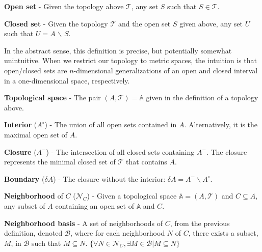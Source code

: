 \begin{defn}
  \textbf{Open set} - Given the topology above $\mathcal{T}$, any set $S$ such
  that $S \in \mathcal{T}$.
\end{defn}

\begin{defn}
  \textbf{Closed set} - Given the topology $\mathcal{T}$ and the open set $S$
  given above, any set $U$ such that $U = A$ $\backslash$ $S$.
\end{defn}

In the abstract sense, this definition is precise, but potentially somewhat unintuitive.
%
When we restrict our topology to metric spaces, the intuition is that open/closed sets are $n$-dimensional generalizations of an open and closed interval in a one-dimensional space, respectively.

\begin{defn}
  \textbf{Topological space} - The pair $(A,\mathcal{T}) = \mathbb{A}$ given in
  the definition of a topology above.
\end{defn}

\begin{defn}
  \textbf{Interior} ($A^{\circ}$) - The union of all open sets
  contained in $A$. Alternatively, it is the maximal open set of $A$.
\end{defn}
\begin{defn}
  \textbf{Closure} ($A^{-}$) - The intersection of all closed sets containing
  $A^{-}$. The closure represents the minimal closed set of $\mathcal{T}$ that
  contains $A$.
\end{defn}
\begin{defn}
  \textbf{Boundary} ($\delta A$) - The closure without the interior:
  $\delta A = A^{-} \backslash A^{\circ}$.
\end{defn}

\begin{defn}
  \textbf{Neighborhood} of $C$ ($\mathcal{N}_C$) - Given a topological space
  $\mathbb{A}=(A,\mathcal{T})$ and $C \subseteq A$, any subset of $A$ containing
  an open set of $\mathbb{A}$ and $C$.
\end{defn}

\begin{defn}
  \textbf{Neighborhood basis} - A set of neighborhoods of $C$,
  from the previous definition, denoted $\mathcal{B}$, where for each
  neighborhood $N$ of $C$, there exists a subset, $M$, in $\mathcal{B}$ such
  that $M \subseteq N$.
  $\{\forall N \in \mathcal{N}_C, \exists M \in \mathcal{B} | M \subseteq N\}$
\end{defn}

